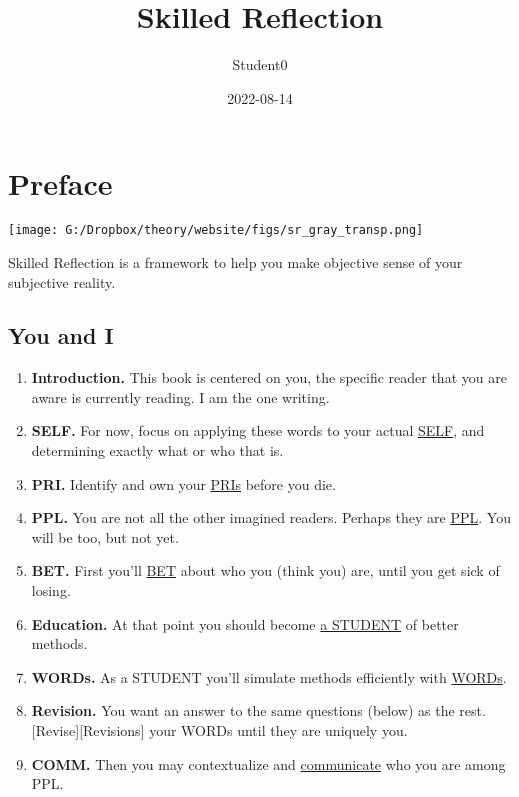 \documentclass[
]{book}
\title{Skilled Reflection}
\author{Student0}
\date{2022-08-14}
\providecommand{\tightlist}{%
  \setlength{\itemsep}{0pt}\setlength{\parskip}{0pt}}
\begin{document}
\maketitle

{
\setcounter{tocdepth}{1}
\tableofcontents
}
\hypertarget{preface}{%
\chapter*{Preface}\label{preface}}

\texttt{[image: G:/Dropbox/theory/website/figs/sr\_gray\_transp.png]}

Skilled Reflection is a framework to help you make objective sense of your subjective reality.

\hypertarget{you-and-i}{%
\section{You and I}\label{you-and-i}}

\begin{enumerate}
\def\labelenumi{\arabic{enumi}.}
\tightlist
\item
  \textbf{Introduction.} This book is centered on you, the specific reader that you are aware is currently reading. I am the one writing.
\item
  \textbf{SELF.} For now, focus on applying these words to your actual \protect\hyperlink{self-1}{SELF}, and determining exactly what or who that is.
\item
  \textbf{PRI.} Identify and own your \protect\hyperlink{priorities}{PRIs} before you die.
\item
  \textbf{PPL.} You are not all the other imagined readers. Perhaps they are \protect\hyperlink{ppl}{PPL}. You will be too, but not yet.
\item
  \textbf{BET.} First you'll \protect\hyperlink{bet}{BET} about who you (think you) are, until you get sick of losing.
\item
  \textbf{Education.} At that point you should become \protect\hyperlink{education}{a STUDENT} of better methods.
\item
  \textbf{WORDs.} As a STUDENT you'll simulate methods efficiently with \protect\hyperlink{words}{WORDs}.
\item
  \textbf{Revision.} You want an answer to the same questions (below) as the rest. {[}Revise{]}{[}Revisions{]} your WORDs until they are uniquely you.
\item
  \textbf{COMM.} Then you may contextualize and \protect\hyperlink{communication}{communicate} who you are among PPL.
\end{enumerate}
\end{document}
